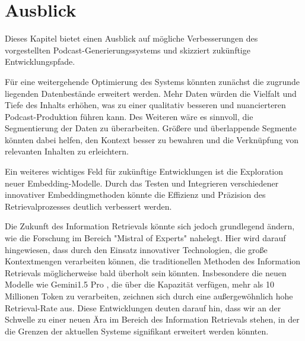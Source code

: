 \chapter{Ausblick}\label{ch:outlook}

Dieses Kapitel bietet einen Ausblick auf mögliche Verbesserungen des vorgestellten Podcast-Generierungssystems und skizziert zukünftige Entwicklungspfade.

Für eine weitergehende Optimierung des Systems könnten zunächst die zugrunde liegenden Datenbestände erweitert werden. Mehr Daten würden die Vielfalt und Tiefe des Inhalts erhöhen, was zu einer qualitativ besseren und nuancierteren Podcast-Produktion führen kann. Des Weiteren wäre es sinnvoll, die Segmentierung der Daten zu überarbeiten. Größere und überlappende Segmente könnten dabei helfen, den Kontext besser zu bewahren und die Verknüpfung von relevanten Inhalten zu erleichtern.

Ein weiteres wichtiges Feld für zukünftige Entwicklungen ist die Exploration neuer Embedding-Modelle. 
Durch das Testen und Integrieren verschiedener innovativer Embeddingmethoden könnte die Effizienz und Präzision des Retrievalprozesses deutlich verbessert werden.

Die Zukunft des Information Retrievals könnte sich jedoch grundlegend ändern, wie die Forschung im Bereich "Mistral of Experts" \cite{jiang2024} nahelegt. Hier wird darauf hingewiesen, dass durch den Einsatz innovativer Technologien, die große Kontextmengen verarbeiten können, die traditionellen Methoden des Information Retrievals möglicherweise bald überholt sein könnten. Insbesondere die neuen Modelle wie Gemini1.5 Pro \cite{2024d}, die über die Kapazität verfügen, mehr als 10 Millionen Token zu verarbeiten, zeichnen sich durch eine außergewöhnlich hohe Retrieval-Rate aus. Diese Entwicklungen deuten darauf hin, dass wir an der Schwelle zu einer neuen Ära im Bereich des Information Retrievals stehen, in der die Grenzen der aktuellen Systeme signifikant erweitert werden könnten.





